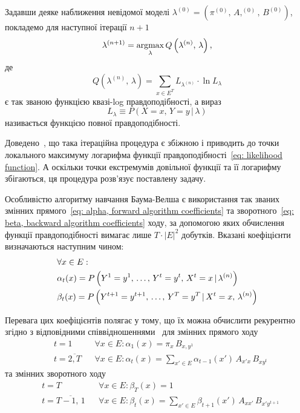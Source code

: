 Задавши деяке наближення невідомої моделі $\lambda^{(0)}=(\pi^{(0)},\,A,^{(0)},\,B^{(0)})$, покладемо для наступної ітерації $n+1$
\begin{equation*}
    \lambda^{(n+1)} = \operatorname*{argmax}\limits_{\lambda} Q\left( \lambda^{(n)},\,\lambda \right),
\end{equation*}
де
\begin{equation}\label{eq: Q quasi-log likelihood function}
    Q\left( \lambda^{(n)},\,\lambda \right) = \sum\limits_{x \in E^T}L_{\lambda^{(n)}}\cdot\ln L_{\lambda}
\end{equation}
є так званою функцією квазі-log правдоподібності, а вираз
\begin{equation*}
    L_{\lambda} \equiv P\left( X=x,\,Y=y \,|\, \lambda \right)
\end{equation*}
називається функцією повної правдоподібності.

Доведено~\cite[розділ 4]{Koski2001}, що така ітераційна процедура є збіжною і приводить до точки локального максимуму логарифма функції правдоподібності~\eqref{eq: likelihood function}. А оскільки точки екстремумів довільної функції та її логарифму збігаються, ця процедура розв'язує поставлену задачу.

Особливістю алгоритму навчання Баума-Велша є використання так званих змінних прямого~\eqref{eq: alpha, forward algorithm coefficients} та зворотного~\eqref{eq: beta, backward algorithm coefficients} ходу, за допомогою яких обчислення функції правдоподібності вимагає лише $T\cdot|E|^2$ добутків. Вказані коефіцієнти визначаються наступним чином:
\begin{align}
    & \forall x \in E: \notag \\
    & \alpha_t(x) = P\left( Y^1=y^1,\,\ldots,\,Y^t=y^t,\,X^t=x \,|\, \lambda^{(n)} \right) \label{eq: alpha, forward algorithm coefficients} \\
    & \beta_t(x) = P\left( Y^{t+1}=y^{t+1},\,\ldots,\,Y^T=y^T \,|\, X^t=x,\, \lambda^{(n)} \right) \label{eq: beta, backward algorithm coefficients}
\end{align}

Перевага цих коефіцієнтів полягає у тому, що їх можна обчислити рекурентно згідно з відповідними співвідношеннями~\cite[розділ 5]{Nilsson2005} для змінних прямого ходу
\begin{align*}
    & t = 1              && \forall x \in E: \alpha_1(x)=\pi_{x}\,B_{x,y^1} \\
    & t = \overline{2,T} && \forall x \in E: \alpha_{t}(x)=\sum\limits_{x'\in E}\alpha_{t-1}(x')\,A_{x'x}\,B_{xy^{t}} 
\end{align*}
та змінних зворотного ходу
\begin{align*}
    & t = T                && \forall x \in E: \beta_T(x)=1 \\
    & t = \overline{T-1,\,1} && \forall x \in E: \beta_t(x)=\sum\limits_{x' \in E}\beta_{t+1}(x')\,A_{x x'}\,B_{x'y^{t+1}}
\end{align*}

